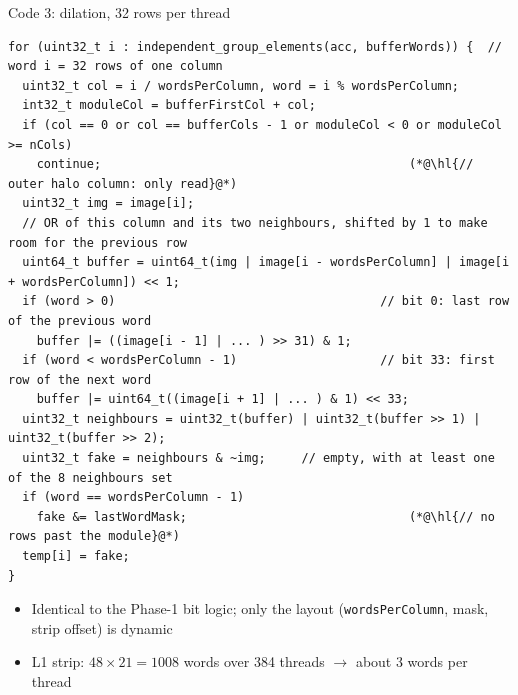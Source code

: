 \documentclass[aspectratio=169,10pt,xcolor=table]{beamer}
\newcommand{\code}[1]{\texttt{\small #1}}
\newcommand{\hl}[1]{\colorbox{cbOrange!25}{#1}}
\begin{document}
\begin{frame}[fragile]{Code 3: dilation, 32 rows per thread}
\begin{lstlisting}
for (uint32_t i : independent_group_elements(acc, bufferWords)) {  // word i = 32 rows of one column
  uint32_t col = i / wordsPerColumn, word = i % wordsPerColumn;
  int32_t moduleCol = bufferFirstCol + col;
  if (col == 0 or col == bufferCols - 1 or moduleCol < 0 or moduleCol >= nCols)
    continue;                                           (*@\hl{// outer halo column: only read}@*)
  uint32_t img = image[i];
  // OR of this column and its two neighbours, shifted by 1 to make room for the previous row
  uint64_t buffer = uint64_t(img | image[i - wordsPerColumn] | image[i + wordsPerColumn]) << 1;
  if (word > 0)                                     // bit 0: last row of the previous word
    buffer |= ((image[i - 1] | ... ) >> 31) & 1;
  if (word < wordsPerColumn - 1)                    // bit 33: first row of the next word
    buffer |= uint64_t((image[i + 1] | ... ) & 1) << 33;
  uint32_t neighbours = uint32_t(buffer) | uint32_t(buffer >> 1) | uint32_t(buffer >> 2);
  uint32_t fake = neighbours & ~img;     // empty, with at least one of the 8 neighbours set
  if (word == wordsPerColumn - 1)
    fake &= lastWordMask;                               (*@\hl{// no rows past the module}@*)
  temp[i] = fake;
}
\end{lstlisting}
  \begin{itemize}\small
    \item Identical to the Phase-1 bit logic; only the layout (\code{wordsPerColumn}, mask, strip offset) is dynamic
    \item L1 strip: $48\times21 = 1008$ words over 384 threads $\to$ about 3 words per thread
  \end{itemize}
\end{frame}
\end{document}

